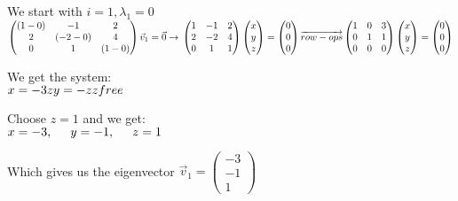 \documentclass{article}
\begin{document}
We start with $i=1, \lambda_{1} = 0$\\
$
\left (
    \begin{matrix}
        (1-0) & -1 & 2 \\
        2 & (-2-0) & 4 \\
        0 & 1 & (1-0)
    \end{matrix}
\right )
\vec{v}_{1} = \vec{0}
\rightarrow \\
\left (
    \begin{matrix}
        1 & -1 & 2\\
        2 & -2 & 4\\
        0 & 1 & 1
    \end{matrix}
\right )
\left (
    \begin{matrix}
        x\\
        y\\
        z
    \end{matrix}
\right )
=
\left (
    \begin{matrix}
        0\\
        0\\
        0
    \end{matrix}
\right )
\overrightarrow{row-ops}
\left (
	\begin{matrix}
		1 & 0 & 3\\
		0 & 1 & 1\\
		0 & 0 & 0
	\end{matrix}
\right )
\left (
    \begin{matrix}
        x\\
        y\\
        z
    \end{matrix}
\right )
=
\left (
    \begin{matrix}
        0\\
        0\\
        0
    \end{matrix}
\right )
$

We get the system:\\
$
x = -3z\\
y = -z\\
z free
$

Choose $z=1$ and we get:\\
$
x = -3, \hspace{5 mm} y = -1, \hspace{5 mm}z = 1
$

Which gives us the eigenvector
$\vec{v}_{1} = 
\left (
    \begin{matrix}
        -3\\
        -1\\
        1
    \end{matrix}
\right )
$
\end{document}
